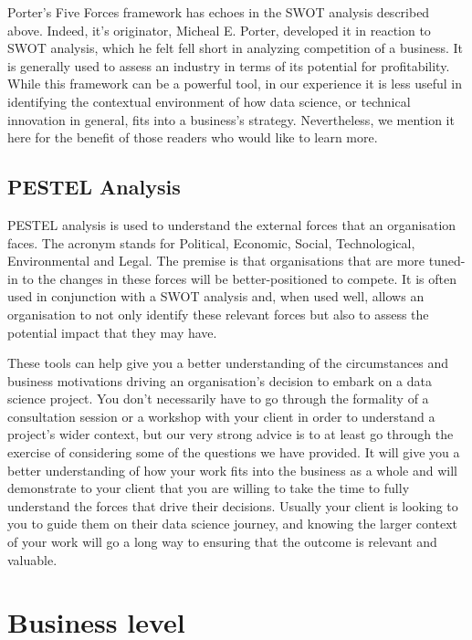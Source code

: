 \documentclass[]{book}
\begin{document}
Porter's Five Forces framework has echoes in the SWOT analysis described
above. Indeed, it's originator, Micheal E. Porter, developed it in
reaction to SWOT analysis, which he felt fell short in analyzing
competition of a business. It is generally used to assess an industry in
terms of its potential for profitability. While this framework can be a
powerful tool, in our experience it is less useful in identifying the
contextual environment of how data science, or technical innovation in
general, fits into a business's strategy. Nevertheless, we mention it
here for the benefit of those readers who would like to learn more.

\hypertarget{pestel-analysis}{%
\subsection{PESTEL Analysis}\label{pestel-analysis}}

PESTEL analysis is used to understand the external forces that an
organisation faces. The acronym stands for Political, Economic, Social,
Technological, Environmental and Legal. The premise is that
organisations that are more tuned-in to the changes in these forces will
be better-positioned to compete. It is often used in conjunction with a
SWOT analysis and, when used well, allows an organisation to not only
identify these relevant forces but also to assess the potential impact
that they may have.

These tools can help give you a better understanding of the
circumstances and business motivations driving an organisation's
decision to embark on a data science project. You don't necessarily have
to go through the formality of a consultation session or a workshop with
your client in order to understand a project's wider context, but our
very strong advice is to at least go through the exercise of considering
some of the questions we have provided. It will give you a better
understanding of how your work fits into the business as a whole and
will demonstrate to your client that you are willing to take the time to
fully understand the forces that drive their decisions. Usually your
client is looking to you to guide them on their data science journey,
and knowing the larger context of your work will go a long way to
ensuring that the outcome is relevant and valuable.

\hypertarget{business-level}{%
\section{Business level}\label{business-level}}
\end{document}
